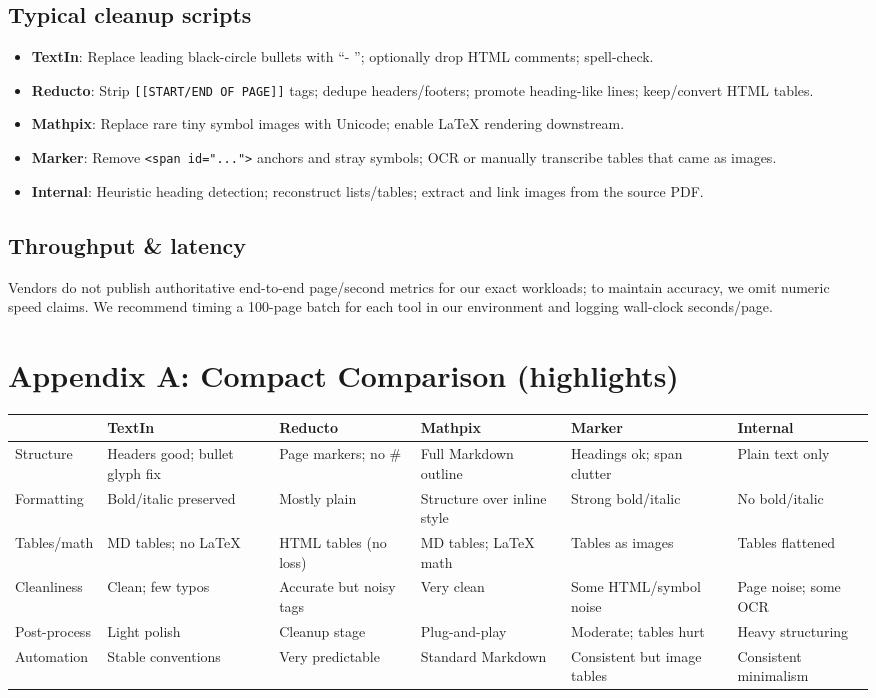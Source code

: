 \documentclass[11pt,a4paper]{article}
\begin{document}
\subsection*{Typical cleanup scripts}
\begin{itemize}[leftmargin=1.2em]
  \item \textbf{TextIn}: Replace leading black-circle bullets with ``- ''; optionally drop HTML comments; spell-check.
  \item \textbf{Reducto}: Strip \verb|[[START/END OF PAGE]]| tags; dedupe headers/footers; promote heading-like lines; keep/convert HTML tables.
  \item \textbf{Mathpix}: Replace rare tiny symbol images with Unicode; enable LaTeX rendering downstream.
  \item \textbf{Marker}: Remove \verb|<span id="...">| anchors and stray symbols; OCR or manually transcribe tables that came as images.
  \item \textbf{Internal}: Heuristic heading detection; reconstruct lists/tables; extract and link images from the source PDF.
\end{itemize}

\subsection*{Throughput \& latency}
Vendors do not publish authoritative end-to-end page/second metrics for our exact workloads; to maintain accuracy, we omit numeric speed claims. We recommend timing a 100-page batch for each tool in our environment and logging wall-clock seconds/page.

\section*{Appendix A: Compact Comparison (highlights)}

\begin{center}
\small
\begin{tabularx}{\textwidth}{@{}lYYYYY@{}}
\toprule
 & \textbf{TextIn} & \textbf{Reducto} & \textbf{Mathpix} & \textbf{Marker} & \textbf{Internal} \\
\midrule
Structure & Headers good; bullet glyph fix & Page markers; no \# & Full Markdown outline & Headings ok; span clutter & Plain text only \\
Formatting & Bold/italic preserved & Mostly plain & Structure over inline style & Strong bold/italic & No bold/italic \\
Tables/math & MD tables; no LaTeX & HTML tables (no loss) & MD tables; LaTeX math & Tables as images & Tables flattened \\
Cleanliness & Clean; few typos & Accurate but noisy tags & Very clean & Some HTML/symbol noise & Page noise; some OCR \\
Post-process & Light polish & Cleanup stage & Plug-and-play & Moderate; tables hurt & Heavy structuring \\
Automation & Stable conventions & Very predictable & Standard Markdown & Consistent but image tables & Consistent minimalism \\
\bottomrule
\end{tabularx}
\end{center}
\end{document}
